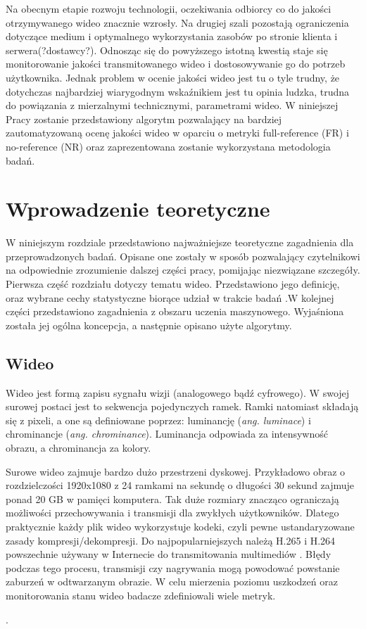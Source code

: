 Na obecnym etapie rozwoju technologii, oczekiwania odbiorcy co do jakości otrzymywanego wideo znacznie wzrosły. Na drugiej szali pozostają ograniczenia dotyczące medium i optymalnego wykorzystania zasobów po stronie klienta i serwera(?dostawcy?). Odnosząc się do powyższego istotną kwestią staje się monitorowanie jakości transmitowanego wideo i dostosowywanie go do potrzeb użytkownika. Jednak problem w ocenie jakości wideo jest tu o tyle trudny, że dotychczas najbardziej wiarygodnym wskaźnikiem jest tu opinia ludzka,  trudna do powiązania z mierzalnymi technicznymi, parametrami wideo. W niniejszej Pracy zostanie przedstawiony algorytm pozwalający na bardziej zautomatyzowaną ocenę jakości wideo w oparciu o metryki full-reference (FR) i no-reference (NR) oraz zaprezentowana zostanie wykorzystana metodologia badań.



\chapter{Wprowadzenie teoretyczne}
\label{cha:pierwszyDokument}

W niniejszym rozdziale przedstawiono najważniejsze teoretyczne zagadnienia dla przeprowadzonych badań. Opisane one zostały w sposób pozwalający czytelnikowi na odpowiednie zrozumienie dalszej części pracy, pomijając niezwiązane szczegóły. Pierwsza część rozdziału dotyczy tematu wideo. Przedstawiono jego definicję, oraz wybrane cechy statystyczne biorące udział w trakcie badań .W kolejnej części przedstawiono zagadnienia z obszaru uczenia maszynowego. Wyjaśniona została jej ogólna koncepcja, a następnie opisano użyte algorytmy.


\section{Wideo}

Wideo jest formą zapisu sygnału wizji (analogowego bądź cyfrowego). W swojej surowej postaci jest to sekwencja pojedynczych ramek. Ramki natomiast składają się z pixeli, a one są definiowane poprzez: luminancję ({\em ang. luminace}) i chrominancje ({\em ang. chrominance}). Luminancja odpowiada za intensywność obrazu, a chrominancja za kolory. 

Surowe wideo zajmuje bardzo dużo przestrzeni dyskowej. Przykładowo obraz o rozdzielczości 1920x1080 z 24 ramkami na sekundę o długości 30 sekund zajmuje ponad 20 GB w pamięci komputera. Tak duże rozmiary znacząco ograniczają możliwości przechowywania i transmisji dla zwykłych użytkowników. Dlatego praktycznie każdy plik wideo wykorzystuje kodeki, czyli pewne ustandaryzowane zasady kompresji/dekompresji. Do najpopularniejszych należą H.265 i H.264 powszechnie używany w Internecie do transmitowania multimediów \cite{video_codecs}. Błędy podczas tego procesu, transmisji czy nagrywania mogą powodować powstanie zaburzeń w odtwarzanym obrazie. W celu mierzenia poziomu uszkodzeń oraz monitorowania stanu wideo badacze zdefiniowali wiele metryk.\par.

